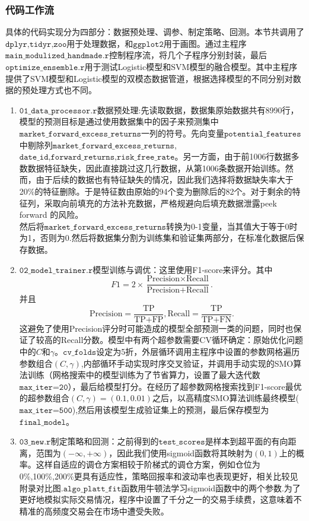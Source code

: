 \documentclass[11pt, a4paper]{article}
\begin{document}
\subsubsection{代码工作流}
具体的代码实现分为四部分：数据预处理、调参、制定策略、回测。本节共调用了$\texttt{dplyr,tidyr,zoo}$用于处理数据，和$\texttt{ggplot2}$用于画图。通过主程序$\texttt{main\_modulized\_handmade.r}$控制程序流，将几个子程序分别封装，最后$\texttt{optimize\_ensemble.r}$用于测试Logistic模型和SVM模型的融合模型。其中主程序提供了SVM模型和Logistic模型的双模态数据管道，根据选择模型的不同分别对数据的预处理方式也不同。
\begin{enumerate}
    \item $\texttt{01\_data\_processor.r}$数据预处理:先读取数据，数据集原始数据共有8990行，模型的预测目标是通过使用数据集中的因子来预测集中$\texttt{market\_forward\_excess\_returns}$一列的符号。先向变量$\texttt{potential\_features}$中剔除列$\texttt{market\_forward\_excess\_returns}$,\\$\texttt{date\_id}$,$\texttt{forward\_returns,risk\_free\_rate}$。另一方面，由于前1006行数据多数数据特征缺失，因此直接跳过这几行数据，从第1006条数据开始训练。然而，由于后续的数据也有特征缺失的情况，因此我们选择将数据缺失率大于20\%的特征删除。于是特征数由原始的94个变为删除后的82个。对于剩余的特征列，采取向前填充的方法补充数据，严格规避向后填充数据泄露peek forward 的风险。\\然后将$\texttt{market\_forward\_excess\_returns}$转换为0-1变量，当其值大于等于0时为1，否则为0.然后将数据集分割为训练集和验证集两部分，在标准化数据后保存数据。
    \item $\texttt{02\_model\_trainer.r}$模型训练与调优：这里使用F1-score来评分。其中$$F1=2\times\frac{\text{Precision}\times \text{Recall}}{\text{Precision}+\text{Recall}}.$$并且$$\text{Precision}=\frac{\text{TP}}{\text{TP}+\text{FP}},\text{Recall}=\frac{\text{TP}}{\text{TP}+\text{FN}}.$$这避免了使用Precision评分时可能造成的模型全部预测一类的问题，同时也保证了较高的Recall分数。模型中有两个超参数需要CV循环确定：原始优化问题中的$C$和$\gamma$。$\texttt{cv\_folds}$设定为5折，外层循环调用主程序中设置的参数网格遍历参数组合$(C,\gamma)$,内部循环手动实现时序交叉验证，并调用手动实现的SMO算法训练（网格搜索中的模型训练为了节省算力，设置了最大迭代数$\texttt{max\_iter=20}$），最后给模型打分。在经历了超参数网格搜索找到F1-score最优的超参数组合$(C,\gamma)=(0.1,0.01)$之后，以高精度SMO算法训练最终模型($\texttt{max\_iter=500}$),然后用该模型生成验证集上的预测，最后保存模型为$\texttt{final\_model}$。
    \item $\texttt{03\_new.r}$制定策略和回测：之前得到的$\texttt{test\_scores}$是样本到超平面的有向距离，范围为$(-\infty, +\infty)$，因此我们使用sigmoid函数将其映射为$(0,1)$上的概率。这样自适应的调仓方案相较于阶梯式的调仓方案，例如仓位为0\%,100\%,200\%更具有适应性，策略回报率和波动率也表现更好，相关比较见附录对比图.$\texttt{algo\_platt\_fit}$函数用牛顿法学习sigmoid函数中的两个参数.为了更好地模拟实际交易情况，程序中设置了千分之一的交易手续费，这意味着不精准的高频度交易会在市场中遭受失败。
    

\end{enumerate}
\end{document}
